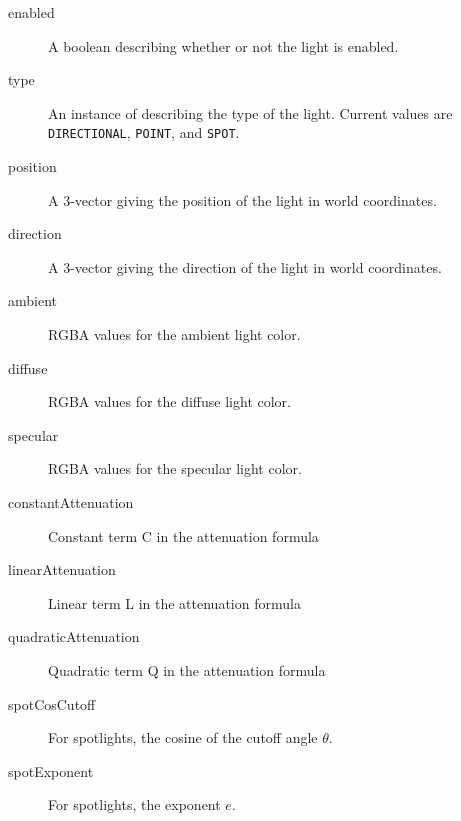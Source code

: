 \begin{description}

\item[enabled]\mbox{}

A boolean describing whether or not the light is enabled.

\item[type]\mbox{}

An instance of 
describing the type of the light. Current values are
{\tt DIRECTIONAL}, {\tt POINT}, and {\tt SPOT}.

\item[position]\mbox{}

A 3-vector giving the position of the light in world coordinates.

\item[direction]\mbox{}

A 3-vector giving the direction of the light in world coordinates.

\item[ambient]\mbox{}

RGBA values for the ambient light color.

\item[diffuse]\mbox{}

RGBA values for the diffuse light color.

\item[specular]\mbox{}

RGBA values for the specular light color.

\item[constantAttenuation]\mbox{}

Constant term C in the attenuation formula

\item[linearAttenuation]\mbox{}

Linear term L in the attenuation formula

\item[quadraticAttenuation]\mbox{}

Quadratic term Q in the attenuation formula

\item[spotCosCutoff]\mbox{}

For spotlights, the cosine of the cutoff angle $\theta$.

\item[spotExponent]\mbox{}

For spotlights, the exponent $e$.

\end{description}

